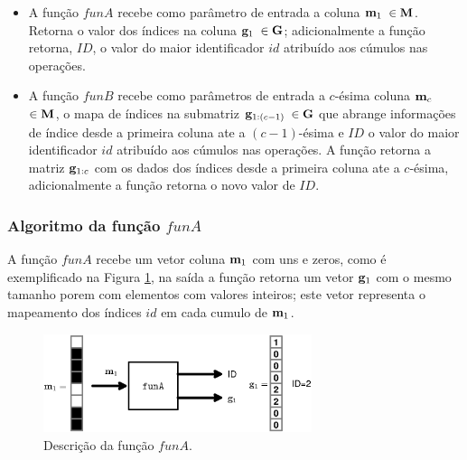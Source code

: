 \begin{itemize}
\item A função $funA$ recebe como parâmetro de entrada a coluna $\VECTOR{m}_1$ $\in\MATRIX{M}$.
Retorna o valor dos índices na coluna $\VECTOR{g}_1$ $\in\MATRIX{G}$;
adicionalmente a função retorna, $ID$, 
o valor do maior identificador $id$ atribuído aos cúmulos nas operações.

\item A função $funB$ recebe como parâmetros de entrada a $c$-ésima 
coluna $\VECTOR{m}_c$ $\in\MATRIX{M}$, o mapa de índices na submatriz $\VECTOR{g}_{1:(c-1)}$ $\in\MATRIX{G}$
que abrange informações de índice desde a primeira coluna ate a $(c-1)$-ésima e
$ID$ o valor do maior identificador $id$ atribuído aos cúmulos nas operações.
A função retorna a matriz $\VECTOR{g}_{1:c}$ com os dados dos índices desde a primeira coluna ate a $c$-ésima,
adicionalmente a função retorna o novo valor de $ID$.
\end{itemize}

\subsubsection{Algoritmo da função $funA$}
\label{subsubsec:funA}
A função $funA$ recebe um vetor coluna $\VECTOR{m}_1$ com uns e zeros, como é exemplificado na
Figura \ref{fig:funA}, na saída a função retorna um vetor $\VECTOR{g}_1$ com o mesmo tamanho
porem com elementos com valores inteiros; este vetor representa o mapeamento dos índices $id$ em cada cumulo de $\VECTOR{m}_1$.
\begin{figure}[!htb]
\centering
\includegraphics[width=0.7\textwidth]{section-cumulos/funA.eps}
\caption{Descrição da função $funA$.}
\label{fig:funA}
\end{figure}

